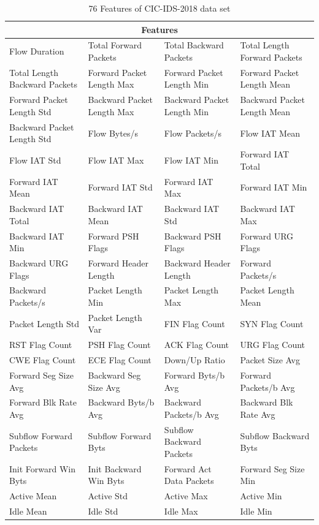 \documentclass[journal]{IEEEtran}
\begin{document}
\begin{table}[!htpb]
    \caption{76 Features of CIC-IDS-2018 data set}
    \label{tab:features}
    \centering
    \begin{tabular}{llll}
    \toprule
    \multicolumn{4}{c}{Features} \\
    \midrule
    Flow Duration & Total Forward Packets & Total Backward Packets & Total Length Forward Packets \\
    Total Length Backward Packets & Forward Packet Length Max & Forward Packet Length Min & Forward Packet Length Mean \\
    Forward Packet Length Std & Backward Packet Length Max & Backward Packet Length Min & Backward Packet Length Mean \\
    Backward Packet Length Std & Flow Bytes/s & Flow Packets/s & Flow IAT Mean \\
    Flow IAT Std & Flow IAT Max & Flow IAT Min & Forward IAT Total \\
    Forward IAT Mean & Forward IAT Std & Forward IAT Max & Forward IAT Min \\
    Backward IAT Total & Backward IAT Mean & Backward IAT Std & Backward IAT Max \\
    Backward IAT Min & Forward PSH Flags & Backward PSH Flags & Forward URG Flags \\
    Backward URG Flags & Forward Header Length & Backward Header Length & Forward Packets/s \\
    Backward Packets/s & Packet Length Min & Packet Length Max & Packet Length Mean \\
    Packet Length Std &  Packet Length Var & FIN Flag Count & SYN Flag Count \\
    RST Flag Count & PSH Flag Count & ACK Flag Count & URG Flag Count \\
    CWE Flag Count & ECE Flag Count & Down/Up Ratio & Packet Size Avg \\
    Forward Seg Size Avg & Backward Seg Size Avg & Forward Byts/b Avg & Forward Packets/b Avg \\
    Forward Blk Rate Avg & Backward Byts/b Avg & Backward Packets/b Avg & Backward Blk Rate Avg \\
    Subflow Forward Packets & Subflow Forward Byts & Subflow Backward Packets & Subflow Backward Byts \\
    Init Forward Win Byts &  Init Backward Win Byts &   Forward Act Data Packets & Forward Seg Size Min \\
    Active Mean & Active Std & Active Max & Active Min \\
    Idle Mean & Idle Std & Idle Max & Idle Min \\
    \bottomrule
    \end{tabular}

\end{table}
\end{document}
